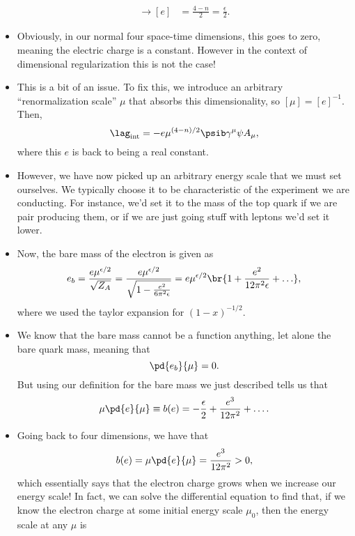 \begin{itemize}
\begin{align}
            \rightarrow [e] &= \frac{4-n}{2} = \frac{\epsilon}{2}.
        \end{align}
    \item Obviously, in our normal four space-time dimensions, this goes to zero, meaning the electric charge is a constant. However in the context of dimensional regularization this is not the case!
    \item This is a bit of an issue. To fix this, we introduce an arbitrary ``renormalization scale'' $\mu$ that absorbs this dimensionality, so $[\mu] = [e]^{-1}$. Then,
        \begin{equation}
            \lag_{\mathrm{int}} = -e \mu^{(4-n)/2} \psib\gamma^{\mu}\psi A_{\mu},
        \end{equation}
        where this $e$ is back to being a real constant.
    \item However, we have now picked up an arbitrary energy scale that we must set ourselves. We typically choose it to be characteristic of the experiment we are conducting. For instance, we'd set it to the mass of the top quark if we are pair producing them, or if we are just going stuff with leptons we'd set it lower.
    \item Now, the bare mass of the electron is given as
        \begin{equation}
            e_b = \frac{e\mu^{\epsilon/2}}{\sqrt{Z_A}} = \frac{e\mu^{\epsilon/2}}{\sqrt{1 - \frac{e^2}{6\pi^2\epsilon}}} = e\mu^{\epsilon/2}\br{1 + \frac{e^2}{12\pi^2\epsilon} + \ldots},
        \end{equation}
        where we used the taylor expansion for $(1-x)^{-1/2}$.
    \item We know that the bare mass cannot be a function anything, let alone the bare quark mass, meaning that 
        \begin{equation}
            \pd{e_b}{\mu} = 0.
        \end{equation}
        But using our definition for the bare mass we just described tells us that
        \begin{equation}
            \mu\pd{e}{\mu} \equiv b(e) = -\frac{\epsilon}{2} + \frac{e^3}{12\pi^2} + \ldots.
        \end{equation}
    \item Going back to four dimensions, we have that 
        \begin{equation}
            b(e) = \mu\pd{e}{\mu} = \frac{e^3}{12\pi^2} > 0,
        \end{equation}
        which essentially says that the electron charge grows when we increase our energy scale! In fact, we can solve the differential equation to find that, if we know the electron charge at some initial energy scale $\mu_0$, then the energy scale at any $\mu$ is

\end{itemize}
